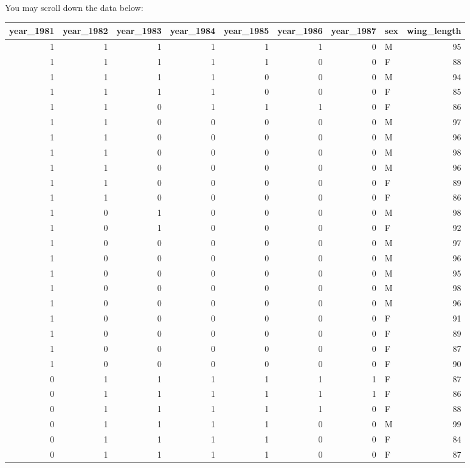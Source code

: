 \documentclass[
  12pt,
]{krantz}
\begin{document}
You may scroll down the data below:

\begin{tabular}{r|r|r|r|r|r|r|l|r}
\hline
year\_1981 & year\_1982 & year\_1983 & year\_1984 & year\_1985 & year\_1986 & year\_1987 & sex & wing\_length\\
\hline
1 & 1 & 1 & 1 & 1 & 1 & 0 & M & 95\\
\hline
1 & 1 & 1 & 1 & 1 & 0 & 0 & F & 88\\
\hline
1 & 1 & 1 & 1 & 0 & 0 & 0 & M & 94\\
\hline
1 & 1 & 1 & 1 & 0 & 0 & 0 & F & 85\\
\hline
1 & 1 & 0 & 1 & 1 & 1 & 0 & F & 86\\
\hline
1 & 1 & 0 & 0 & 0 & 0 & 0 & M & 97\\
\hline
1 & 1 & 0 & 0 & 0 & 0 & 0 & M & 96\\
\hline
1 & 1 & 0 & 0 & 0 & 0 & 0 & M & 98\\
\hline
1 & 1 & 0 & 0 & 0 & 0 & 0 & M & 96\\
\hline
1 & 1 & 0 & 0 & 0 & 0 & 0 & F & 89\\
\hline
1 & 1 & 0 & 0 & 0 & 0 & 0 & F & 86\\
\hline
1 & 0 & 1 & 0 & 0 & 0 & 0 & M & 98\\
\hline
1 & 0 & 1 & 0 & 0 & 0 & 0 & F & 92\\
\hline
1 & 0 & 0 & 0 & 0 & 0 & 0 & M & 97\\
\hline
1 & 0 & 0 & 0 & 0 & 0 & 0 & M & 96\\
\hline
1 & 0 & 0 & 0 & 0 & 0 & 0 & M & 95\\
\hline
1 & 0 & 0 & 0 & 0 & 0 & 0 & M & 98\\
\hline
1 & 0 & 0 & 0 & 0 & 0 & 0 & M & 96\\
\hline
1 & 0 & 0 & 0 & 0 & 0 & 0 & F & 91\\
\hline
1 & 0 & 0 & 0 & 0 & 0 & 0 & F & 89\\
\hline
1 & 0 & 0 & 0 & 0 & 0 & 0 & F & 87\\
\hline
1 & 0 & 0 & 0 & 0 & 0 & 0 & F & 90\\
\hline
0 & 1 & 1 & 1 & 1 & 1 & 1 & F & 87\\
\hline
0 & 1 & 1 & 1 & 1 & 1 & 1 & F & 86\\
\hline
0 & 1 & 1 & 1 & 1 & 1 & 0 & F & 88\\
\hline
0 & 1 & 1 & 1 & 1 & 0 & 0 & M & 99\\
\hline
0 & 1 & 1 & 1 & 1 & 0 & 0 & F & 84\\
\hline
0 & 1 & 1 & 1 & 1 & 0 & 0 & F & 87\\

\end{tabular}
\end{document}

